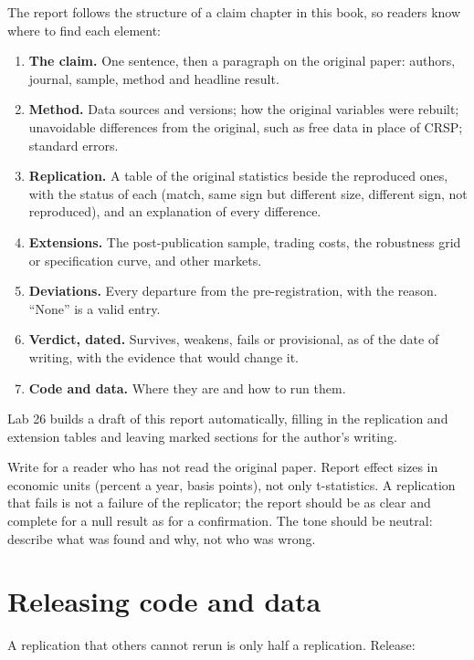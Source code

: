 The report follows the structure of a claim chapter in this book, so readers know where to find each element:

\begin{enumerate}
  \item \textbf{The claim.} One sentence, then a paragraph on the original paper: authors, journal, sample, method and headline result.
  \item \textbf{Method.} Data sources and versions; how the original variables were rebuilt; unavoidable differences from the original, such as free data in place of CRSP; standard errors.
  \item \textbf{Replication.} A table of the original statistics beside the reproduced ones, with the status of each (match, same sign but different size, different sign, not reproduced), and an explanation of every difference.
  \item \textbf{Extensions.} The post-publication sample, trading costs, the robustness grid or specification curve, and other markets.
  \item \textbf{Deviations.} Every departure from the pre-registration, with the reason. ``None'' is a valid entry.
  \item \textbf{Verdict, dated.} Survives, weakens, fails or provisional, as of the date of writing, with the evidence that would change it.
  \item \textbf{Code and data.} Where they are and how to run them.
\end{enumerate}

Lab 26 builds a draft of this report automatically, filling in the replication and extension tables and leaving marked sections for the author's writing.

Write for a reader who has not read the original paper. Report effect sizes in economic units (percent a year, basis points), not only t-statistics. A replication that fails is not a failure of the replicator; the report should be as clear and complete for a null result as for a confirmation. The tone should be neutral: describe what was found and why, not who was wrong.

\section{Releasing code and data}
\label{sec:26-release}

A replication that others cannot rerun is only half a replication. Release:

